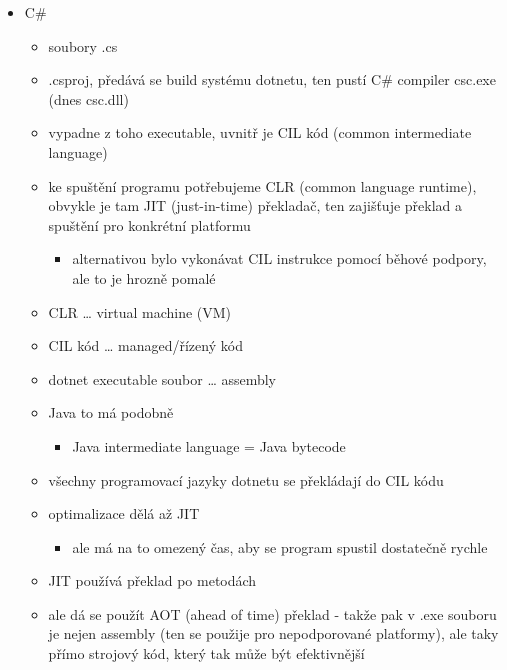 \begin{itemize}
\begin{itemize}
\begin{itemize}
\item Apple 6502 $\to$ Motorola 68000 (32bit) $\to$ IBM PowerPC (32bit) $\to$ Intel x86 (32bit) $\to$ Intel x64 (64bit) $\to$ Apple M1/M2 (ARM64, 64bit)
\item vymysleli fat binary (universal executable) - jeden spustitelný soubor, v něm je více verzí programu najednou
\item řeší to problém zpětné kompatibility, ne dopředné
\end{itemize}
\item C\#
\begin{itemize}
\item soubory .cs
\item .csproj, předává se build systému dotnetu, ten pustí C\# compiler csc.exe (dnes csc.dll)
\item vypadne z toho executable, uvnitř je CIL kód (common intermediate language)
\item ke spuštění programu potřebujeme CLR (common language runtime), obvykle je tam JIT (just-in-time) překladač, ten zajišťuje překlad a spuštění pro konkrétní platformu
\begin{itemize}
\item alternativou bylo vykonávat CIL instrukce pomocí běhové podpory, ale to je hrozně pomalé
\end{itemize}
\item CLR \dots{} virtual machine (VM)
\item CIL kód \dots{} managed/řízený kód
\item dotnet executable soubor \dots{} assembly
\item Java to má podobně
\begin{itemize}
\item Java intermediate language = Java bytecode
\end{itemize}
\item všechny programovací jazyky dotnetu se překládají do CIL kódu
\item optimalizace dělá až JIT
\begin{itemize}
\item ale má na to omezený čas, aby se program spustil dostatečně rychle
\end{itemize}
\item JIT používá překlad po metodách
\item ale dá se použít AOT (ahead of time) překlad - takže pak v .exe souboru je nejen assembly (ten se použije pro nepodporované platformy), ale taky přímo strojový kód, který tak může být efektivnější

\end{itemize}
\end{itemize}
\end{itemize}

